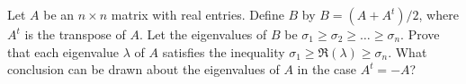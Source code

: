 Let $A$ be an $n\times n$ matrix with real entries. Define $B$ by
$B=(A+A^t)/2$, where $A^t$ is the transpose of $A$. Let the
eigenvalues of $B$ be $\sigma_1\geq \sigma_2\geq \ldots \geq
\sigma_n$. Prove that each eigenvalue $\lambda$ of $A$ satisfies the
inequality $\sigma_1\geq \Re(\lambda)\geq \sigma_n$. What conclusion
can be drawn about the eigenvalues of $A$ in the case $A^t=-A$?
